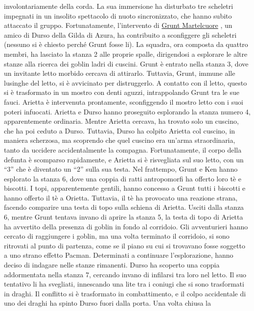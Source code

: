 involontariamente della corda. La sua immersione ha disturbato tre
scheletri impegnati in un insolito spettacolo di nuoto sincronizzato,
che hanno subito attaccato il gruppo. Fortunatamente, l'intervento di
\href{Grunt\%20Martelcuore\%20904d4cbd76ee43c29753bdefdc19d019.md}{Grunt
Martelcuore} , un amico di Durso della Gilda di Azura, ha contribuito a
sconfiggere gli scheletri (nessuno si è chiesto perché Grunt fosse li).
La squadra, ora composta da quattro membri, ha lasciato la stanza 2 alle
proprie spalle, dirigendosi a esplorare le altre stanze alla ricerca dei
goblin ladri di cuscini. Grunt è entrato nella stanza 3, dove un
invitante letto morbido cercava di attirarlo. Tuttavia, Grunt, immune
alle lusinghe del letto, si è avvicinato per distruggerlo. A contatto
con il letto, questo si è trasformato in un mostro con denti aguzzi,
intrappolando Grunt tra le sue fauci. Arietta è intervenuta prontamente,
sconfiggendo il mostro letto con i suoi poteri infuocati. Arietta e
Durso hanno proseguito esplorando la stanza numero 4, apparentemente
ordinaria. Mentre Arietta cercava, ha trovato solo un cuscino, che ha
poi ceduto a Durso. Tuttavia, Durso ha colpito Arietta col cuscino, in
maniera scherzosa, ma scoprendo che quel cuscino era un'arma
straordinaria, tanto da uccidere accidentalmente la compagna.
Fortunatamente, il corpo della defunta è scomparso rapidamente, e
Arietta si è risvegliata sul suo letto, con un ``3'' che è diventato un
``2'' sulla sua testa. Nel frattempo, Grunt e Ken hanno esplorato la
stanza 6, dove una coppia di ratti antropomorfi ha offerto loro tè e
biscotti. I topi, apparentemente gentili, hanno concesso a Grunt tutti i
biscotti e hanno offerto il tè a Orietta. Tuttavia, il tè ha provocato
una reazione strana, facendo comparire una testa di topo sulla schiena
di Arietta. Usciti dalla stanza 6, mentre Grunt tentava invano di aprire
la stanza 5, la testa di topo di Arietta ha avvertito della presenza di
goblin in fondo al corridoio. Gli avventurieri hanno cercato di
raggiungere i goblin, ma una volta terminato il corridoio, si sono
ritrovati al punto di partenza, come se il piano su cui si trovavano
fosse soggetto a uno strano effetto Pacman. Determinati a continuare
l'esplorazione, hanno deciso di indagare nelle stanze rimanenti. Durso
ha scoperto una coppia addormentata nella stanza 7, cercando invano di
infilarsi tra loro nel letto. Il suo tentativo li ha svegliati,
innescando una lite tra i coniugi che si sono trasformati in draghi. Il
conflitto si è trasformato in combattimento, e il colpo accidentale di
uno dei draghi ha spinto Durso fuori dalla porta. Una volta chiusa la
